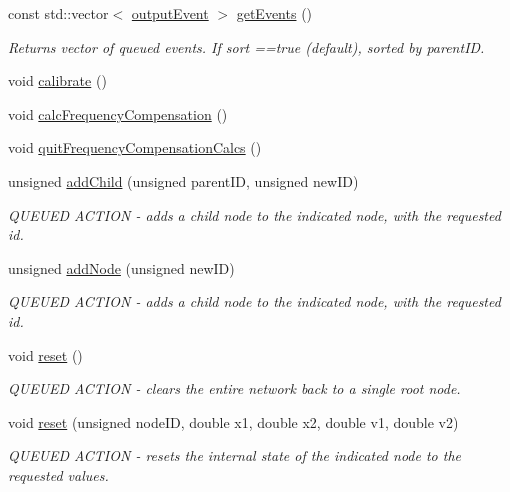 \begin{DoxyCompactItemize}
const std\+::vector$<$ \hyperlink{classMatsuokaEngine_a09035e4918ce82c9378821c88375f843}{output\+Event} $>$ \hyperlink{classMatsuokaEngine_a70444163eee59d0df5b282bb8696f5a1}{get\+Events} ()
\begin{DoxyCompactList}\small\item\em Returns vector of queued events. If sort ==true (default), sorted by parent\+ID. \end{DoxyCompactList}\item 
void \hyperlink{classMatsuokaEngine_a68d6295dfa0d28e3bc9d743e763d6ee9}{calibrate} ()
\item 
void \hyperlink{classMatsuokaEngine_a7b665074cd1e6fddc875c7d36b305f66}{calc\+Frequency\+Compensation} ()
\item 
void \hyperlink{classMatsuokaEngine_a7937f29c227ad663eb153b01b11d307f}{quit\+Frequency\+Compensation\+Calcs} ()
\item 
unsigned \hyperlink{classMatsuokaEngine_a2e441b2259ae96759bf300c1f2af4ab1}{add\+Child} (unsigned parent\+ID, unsigned new\+ID)
\begin{DoxyCompactList}\small\item\em Q\+U\+E\+U\+ED A\+C\+T\+I\+ON -\/ adds a child node to the indicated node, with the requested id. \end{DoxyCompactList}\item 
unsigned \hyperlink{classMatsuokaEngine_a0c27d6c36b0b65e1a6ec0261d83a2495}{add\+Node} (unsigned new\+ID)
\begin{DoxyCompactList}\small\item\em Q\+U\+E\+U\+ED A\+C\+T\+I\+ON -\/ adds a child node to the indicated node, with the requested id. \end{DoxyCompactList}\item 
void \hyperlink{classMatsuokaEngine_a627983362b1b84ee5d3c72d7540d9a47}{reset} ()
\begin{DoxyCompactList}\small\item\em Q\+U\+E\+U\+ED A\+C\+T\+I\+ON -\/ clears the entire network back to a single root node. \end{DoxyCompactList}\item 
void \hyperlink{classMatsuokaEngine_aa2a425173fed2f3f30c1fa5c6e680764}{reset} (unsigned node\+ID, double x1, double x2, double v1, double v2)
\begin{DoxyCompactList}\small\item\em Q\+U\+E\+U\+ED A\+C\+T\+I\+ON -\/ resets the internal state of the indicated node to the requested values. \end{DoxyCompactList}\item 

\end{DoxyCompactItemize}
